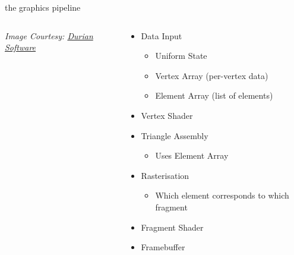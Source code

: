 \documentclass[aspectratio=169,xcolor={dvipsnames,svgnames}]{beamer}
\begin{document}
\begin{frame}[label={sec:orgea020e3}]{the graphics pipeline}
\begin{columns}
\begin{column}{.3\columnwidth}
\begin{center}
\end{center}
\tiny \emph{Image Courtesy: \href{https://duriansoftware.com/joe/media/gl1-pipeline-01.png}{Durian Software}}
\end{column}
\begin{column}{.7\columnwidth}
\begin{itemize}[<+>]
\item Data Input
\begin{itemize}[<. | only@.>]
\item Uniform State
\item Vertex Array (per-vertex data)
\item Element Array (list of elements)
\end{itemize}
\item \alert{Vertex Shader}
\item Triangle Assembly 
\begin{itemize}[<. | only@.>]
\item Uses Element Array
\end{itemize}
\item Rasterisation
\begin{itemize}[<. | only@.>]
\item Which element corresponds to which fragment
\end{itemize}
\item \alert{Fragment Shader}
\item Framebuffer
\end{itemize}
\end{column}
\end{columns}
\end{frame}
\end{document}
